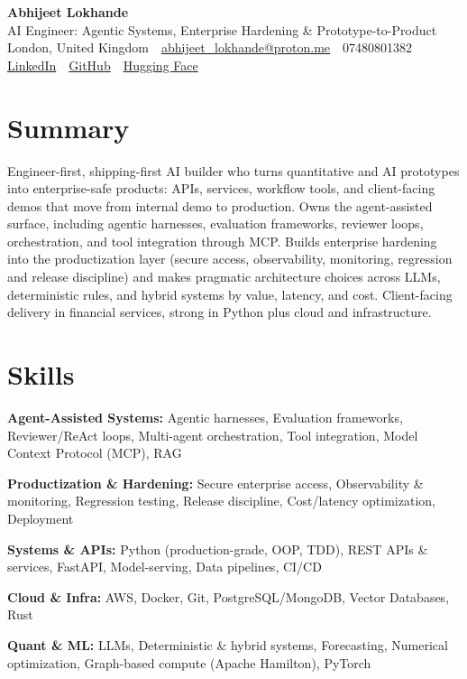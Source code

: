 \documentclass[10pt,a4paper]{article}
\newcommand{\sep}{\,\textcolor{accent!60}{\textbar}\,}
\begin{document}
\begin{center}
  {\fontsize{24}{26}\selectfont\bfseries Abhijeet Lokhande}\\[3pt]
  {\color{accent}\large AI Engineer: Agentic Systems, Enterprise Hardening \& Prototype-to-Product}\\[5pt]
  {\small
    London, United Kingdom \sep
    \href{mailto:abhijeet_lokhande@proton.me}{abhijeet\_lokhande@proton.me} \sep
    07480801382 \\[2pt]
    \href{https://www.linkedin.com/in/ablds/}{LinkedIn} \sep
    \href{https://github.com/abhijeetscode}{GitHub} \sep
    \href{https://huggingface.co/ab-ai}{Hugging Face}
  }
\end{center}
\vspace{2pt}

\section{Summary}
Engineer-first, shipping-first AI builder who turns quantitative and AI prototypes into enterprise-safe products: APIs, services, workflow tools, and client-facing demos that move from internal demo to production. Owns the agent-assisted surface, including agentic harnesses, evaluation frameworks, reviewer loops, orchestration, and tool integration through MCP. Builds enterprise hardening into the productization layer (secure access, observability, monitoring, regression and release discipline) and makes pragmatic architecture choices across LLMs, deterministic rules, and hybrid systems by value, latency, and cost. Client-facing delivery in financial services, strong in Python plus cloud and infrastructure.

\section{Skills}
\begin{tight}
  \item[\textcolor{accent}{\small$\bullet$}] \textbf{Agent-Assisted Systems:} Agentic harnesses, Evaluation frameworks, Reviewer/ReAct loops, Multi-agent orchestration, Tool integration, Model Context Protocol (MCP), RAG
  \item[\textcolor{accent}{\small$\bullet$}] \textbf{Productization \& Hardening:} Secure enterprise access, Observability \& monitoring, Regression testing, Release discipline, Cost/latency optimization, Deployment
  \item[\textcolor{accent}{\small$\bullet$}] \textbf{Systems \& APIs:} Python (production-grade, OOP, TDD), REST APIs \& services, FastAPI, Model-serving, Data pipelines, CI/CD
  \item[\textcolor{accent}{\small$\bullet$}] \textbf{Cloud \& Infra:} AWS, Docker, Git, PostgreSQL/MongoDB, Vector Databases, Rust
  \item[\textcolor{accent}{\small$\bullet$}] \textbf{Quant \& ML:} LLMs, Deterministic \& hybrid systems, Forecasting, Numerical optimization, Graph-based compute (Apache Hamilton), PyTorch
\end{tight}
\end{document}
